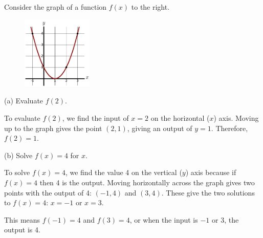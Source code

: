 \begin{example}
Consider the graph of a function $f(x)$ to the right.

    \begin{itemize}
        \begin{minipage}{\linewidth}
        \begin{figure}
            \centering
            \vspace{-32pt}
            \includegraphics[width=0.3\textwidth]{img/chap1/sec1-2/ex117.png}
        \end{figure}
        \item[(a)] Evaluate $f(2)$.

        \solution To evaluate $f(2)$, we find the input of $x=2$ on the horizontal ($x$) axis. Moving up to the graph gives the point $(2, 1)$, giving an output of $y=1$. Therefore, $f(2) = 1$.

        \item[(b)] Solve $f(x) = 4$ for $x$.

        \solution To solve $f(x) = 4$, we find the value 4 on the vertical ($y$) axis because if $f(x) = 4$ then 4 is the output. Moving horizontally across the graph gives two points with the output of 4: $(-1,4)$ and $(3,4)$. These give the two solutions to $f(x) = 4$: $x = -1$ or $x = 3$.

        This means $f(-1)=4$ and $f(3)=4$, or when the input is $-1$ or 3, the output is 4.
    \end{minipage}
    \end{itemize}

\end{example}


